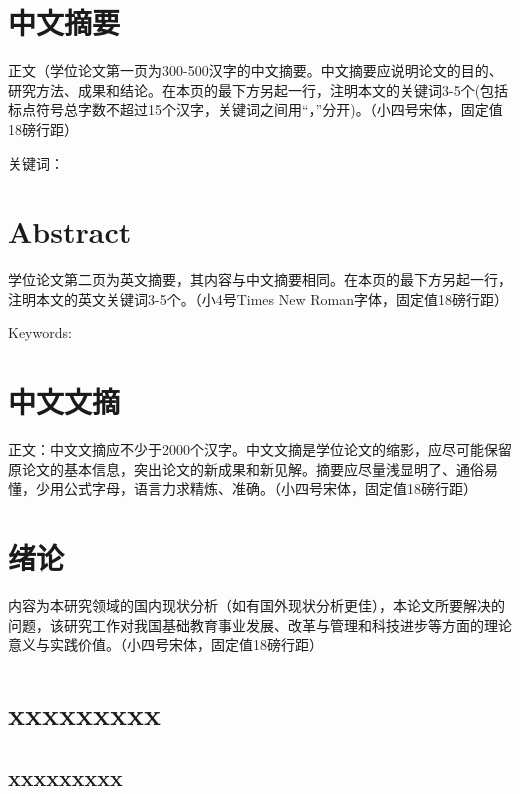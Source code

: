 \documentclass[master]{fnuthesis}
\begin{document}
\frontmatter

\chapter{中文摘要}

正文（学位论文第一页为300-500汉字的中文摘要。中文摘要应说明论文的目的、研究方法、成果和结论。在本页的最下方另起一行，注明本文的关键词3-5个(包括标点符号总字数不超过15个汉字，关键词之间用“，”分开)。（小四号宋体，固定值18磅行距）

\vfill

关键词：

\chapter{Abstract}

学位论文第二页为英文摘要，其内容与中文摘要相同。在本页的最下方另起一行，注明本文的英文关键词3-5个。（小4号Times New Roman字体，固定值18磅行距）

\vfill

Keywords:

\chapter{中文文摘}

正文：中文文摘应不少于2000个汉字。中文文摘是学位论文的缩影，应尽可能保留原论文的基本信息，突出论文的新成果和新见解。摘要应尽量浅显明了、通俗易懂，少用公式字母，语言力求精炼、准确。（小四号宋体，固定值18磅行距）

\tableofcontents

\chapter{绪论}

内容为本研究领域的国内现状分析（如有国外现状分析更佳），本论文所要解决的问题，该研究工作对我国基础教育事业发展、改革与管理和科技进步等方面的理论意义与实践价值。（小四号宋体，固定值18磅行距）

\mainmatter

\chapter{xxxxxxxxx}

\section{xxxxxxxxx}
\end{document}
